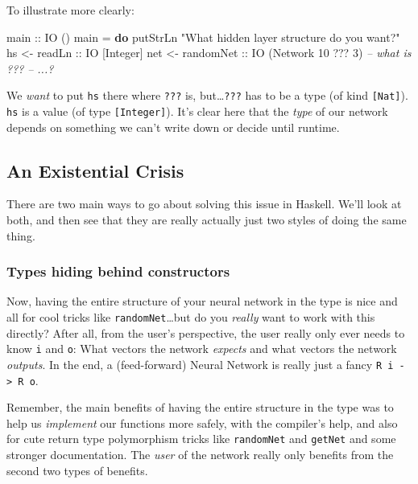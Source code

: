 \documentclass[]{article}
\newenvironment{Shaded}{}{}
\newcommand{\KeywordTok}[1]{\textcolor[rgb]{0.00,0.44,0.13}{\textbf{{#1}}}}
\newcommand{\DataTypeTok}[1]{\textcolor[rgb]{0.56,0.13,0.00}{{#1}}}
\newcommand{\DecValTok}[1]{\textcolor[rgb]{0.25,0.63,0.44}{{#1}}}
\newcommand{\StringTok}[1]{\textcolor[rgb]{0.25,0.44,0.63}{{#1}}}
\newcommand{\CommentTok}[1]{\textcolor[rgb]{0.38,0.63,0.69}{\textit{{#1}}}}
\newcommand{\OtherTok}[1]{\textcolor[rgb]{0.00,0.44,0.13}{{#1}}}
\newcommand{\FunctionTok}[1]{\textcolor[rgb]{0.02,0.16,0.49}{{#1}}}
\newcommand{\NormalTok}[1]{{#1}}
\begin{document}
To illustrate more clearly:

\begin{Shaded}
\begin{Highlighting}[]
\OtherTok{main ::} \DataTypeTok{IO} \NormalTok{()}
\NormalTok{main }\FunctionTok{=} \KeywordTok{do}
    \NormalTok{putStrLn }\StringTok{"What hidden layer structure do you want?"}
    \NormalTok{hs  }\OtherTok{<- readLn    ::} \DataTypeTok{IO} \NormalTok{[}\DataTypeTok{Integer}\NormalTok{]}
    \NormalTok{net }\OtherTok{<- randomNet ::} \DataTypeTok{IO} \NormalTok{(}\DataTypeTok{Network} \DecValTok{10} \FunctionTok{???} \DecValTok{3}\NormalTok{)   }\CommentTok{-- what is ???}
    \CommentTok{-- ...?}
\end{Highlighting}
\end{Shaded}

We \emph{want} to put \texttt{hs} there where \texttt{???} is,
but\ldots{}\texttt{???} has to be a type (of kind \texttt{{[}Nat{]}}).
\texttt{hs} is a value (of type \texttt{{[}Integer{]}}). It's clear here that
the \emph{type} of our network depends on something we can't write down or
decide until runtime.

\subsection{An Existential Crisis}\label{an-existential-crisis}

There are two main ways to go about solving this issue in Haskell. We'll look at
both, and then see that they are really actually just two styles of doing the
same thing.

\subsubsection{Types hiding behind
constructors}\label{types-hiding-behind-constructors}

Now, having the entire structure of your neural network in the type is nice and
all for cool tricks like \texttt{randomNet}\ldots{}but do you \emph{really} want
to work with this directly? After all, from the user's perspective, the user
really only ever needs to know \texttt{i} and \texttt{o}: What vectors the
network \emph{expects} and what vectors the network \emph{outputs}. In the end,
a (feed-forward) Neural Network is really just a fancy
\texttt{R\ i\ -\textgreater{}\ R\ o}.

Remember, the main benefits of having the entire structure in the type was to
help us \emph{implement} our functions more safely, with the compiler's help,
and also for cute return type polymorphism tricks like \texttt{randomNet} and
\texttt{getNet} and some stronger documentation. The \emph{user} of the network
really only benefits from the second two types of benefits.
\end{document}
